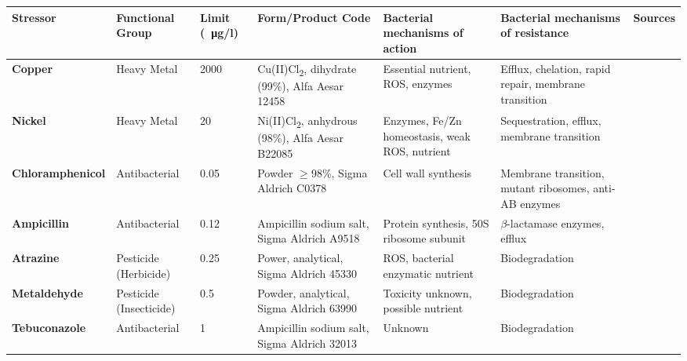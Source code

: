 \documentclass[final,1p,times]{elsarticle}
\begin{document}

\begin{landscape}
\begin{table}[ht]
\begin{threeparttable}
\small
\setlength{\tabcolsep}{4pt}
\setlength{\extrarowheight}{3pt}
\begin{tabular}{l M l K K K c}
\toprule
\textbf{Stressor} & \textbf{Functional Group} & \textbf{Limit (\SI{}{\ug}/l}) & \textbf{Form/Product Code} & \textbf{Bacterial mechanisms of action} & \textbf{Bacterial mechanisms of resistance} & \textbf{Sources} \\
\midrule
{}\textbf{Copper} & Heavy Metal & 2000 & Cu(II)Cl\textsubscript{2}, dihydrate (99\%), Alfa Aesar 12458 & Essential nutrient, ROS, enzymes & Efflux, chelation, rapid repair, membrane transition & \cite{Nayar2004EnvironmentalMesocosms,Valko2005,Dupont2011,ECHA2018Cu} \\
\textbf{Nickel} & Heavy Metal & 20 & Ni(II)Cl\textsubscript{2}, anhydrous (98\%), Alfa Aesar B22085 & Enzymes, Fe/Zn homeostasis, weak ROS, nutrient & Sequestration, efflux, membrane transition & \cite{Nayar2004EnvironmentalMesocosms,Macomber2011,Nishimura1998,Zamble2015} \\
\textbf{Chloramphenicol} & Antibacterial & 0.05 & Powder $\geqslant$98\%, Sigma Aldrich C0378 & Cell wall synthesis & Membrane transition, mutant ribosomes, anti-AB enzymes & \cite{Shaw1979,Rebstock1949,Toku-E2018Ch,Ruiz1999MechanismsFish} \\
\textbf{Ampicillin} & Antibacterial & 0.12 & Ampicillin sodium salt, Sigma Aldrich A9518 & Protein synthesis, 50S ribosome subunit & $\beta$-lactamase enzymes, efflux & \cite{Ruiz1999MechanismsFish,Costanzo2005} \\
\textbf{Atrazine} & Pesticide (Herbicide) & 0.25 & Power, analytical, Sigma Aldrich 45330 & ROS, bacterial enzymatic nutrient & Biodegradation & \cite{Shimabukuro1969,Delorenzo2001,Zhang2012} \\
\textbf{Metaldehyde} & Pesticide \break (Insecticide) & 0.5 & Powder, analytical, Sigma Aldrich 63990 & Toxicity unknown, possible nutrient & Biodegradation & \cite{Kay2014,Castle2017,Thomas2017} \\
\textbf{Tebuconazole} & Antibacterial & 1 & Ampicillin sodium salt, Sigma Aldrich 32013 & Unknown & Biodegradation & \cite{Sehnem2010,Artigas2014ComparativeEcosystems} \\

\end{tabular}
\end{threeparttable}
\end{table}
\end{landscape}
\end{document}
